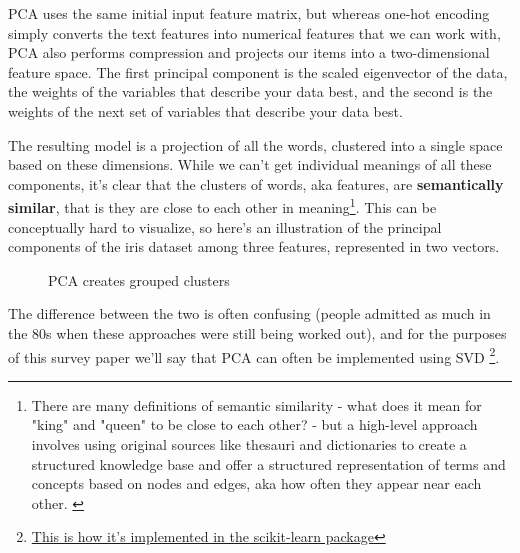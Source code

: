 \documentclass[11pt, table]{diazessay} %
\begin{document}
\begin{sloppypar}
PCA uses the same initial input feature matrix, but whereas one-hot encoding simply converts the text features into numerical features that we can work with, PCA also performs compression and projects our items into a two-dimensional feature space.  The first principal component is the scaled eigenvector of the data, the weights of the variables that describe your data best, and the second is the weights of the next set of variables that describe your data best.

The resulting model is a projection of all the words, clustered into a single space based on these dimensions. While we can't get individual meanings of all these components, it’s clear that the clusters of words, aka features, are \textbf{semantically similar}, that is they are close to each other in meaning\footnote{There are many definitions of semantic similarity - what does it mean for "king" and "queen" to be close to each other? - but a high-level approach involves using original sources like thesauri and dictionaries to create a structured knowledge base and offer a structured representation of terms and concepts based on nodes and edges, aka how often they appear near each other. \cite{chandrasekaran2021evolution}}. This can be conceptually hard to visualize, so here's an illustration of the principal components of the iris dataset among three features, represented in two vectors.

\begin{figure}[H]
    	\caption{PCA creates grouped clusters}
  	\end{figure}



The difference between the two is often confusing (people admitted as much in the 80s \cite{gerbrands1981relationships} when these approaches were still being worked out), and for the purposes of this survey paper we'll say that PCA can often be implemented using SVD \footnote{\href{https://scikit-learn.org/stable/modules/generated/sklearn.decomposition.PCA.html}{This is how it's implemented in the scikit-learn package}}.  



\end{sloppypar}
\end{document}
